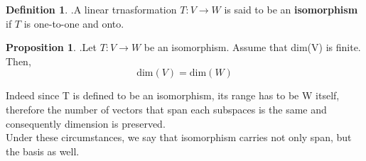 \documentclass[
12pt,
]{article}
\theoremstyle{definition}
\theoremstyle{definition}
\theoremstyle{definition}
\newtheorem{Definition}{Definition}[section]
\theoremstyle{definition}
\newtheorem{Proposition}{Proposition}[section]
\begin{document}
\begin{Definition} .A linear trnasformation $T:V \xrightarrow{} W$ is said to be an \textbf{isomorphism} if $T$ is one-to-one and onto.\\
\end{Definition}
\begin{Proposition} .Let $T:V \xrightarrow{} W$ be an isomorphism. Assume that dim(V) is finite.\\
\quad\quad Then,
$$ \text{dim}(V) = \text{dim}(W)$$
\end{Proposition}
Indeed since T is defined to be an isomorphism, its range has to be W itself, therefore the number of vectors that span each subspaces is the same and consequently dimension is preserved.\\
Under these circumstances, we say that isomorphism carries not only span, but the basis as well.
\end{document}
